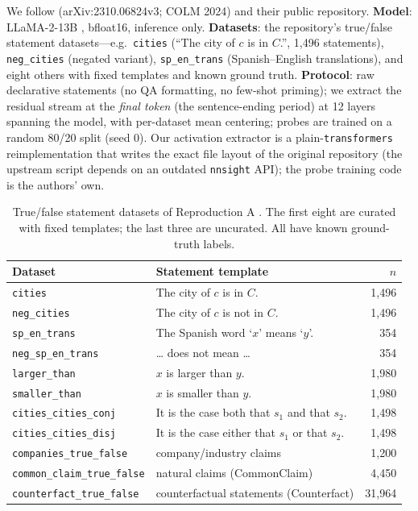\documentclass{article}
\begin{document}
We follow \citet{marks2024geometry} (arXiv:2310.06824v3; COLM 2024) and their
public repository. \textbf{Model}: LLaMA-2-13B \citep{touvron2023llama},
bfloat16, inference only. \textbf{Datasets}: the repository's true/false
statement datasets---e.g.\ \texttt{cities} (``The city of $c$ is in $C$.'',
1{,}496 statements), \texttt{neg\_cities} (negated variant),
\texttt{sp\_en\_trans} (Spanish--English translations), and eight others with
fixed templates and known ground truth. \textbf{Protocol}: raw declarative
statements (no QA formatting, no few-shot priming); we extract the residual
stream at the \emph{final token} (the sentence-ending period) at 12 layers
spanning the model, with per-dataset mean centering; probes are trained on a
random 80/20 split (seed 0). Our activation extractor is a
plain-\texttt{transformers} reimplementation that writes the exact file layout
of the original repository (the upstream script depends on an outdated
\texttt{nnsight} API); the probe training code is the authors' own.

\begin{table}[t]
  \caption{True/false statement datasets of Reproduction A
  \citep{marks2024geometry}. The first eight are curated with fixed templates;
  the last three are uncurated. All have known ground-truth labels.}
  \label{tab:datasets}
  \centering
  \small
  \begin{tabular}{llr}
    \toprule
    Dataset & Statement template & $n$ \\
    \midrule
    \texttt{cities} & The city of $c$ is in $C$. & 1{,}496 \\
    \texttt{neg\_cities} & The city of $c$ is not in $C$. & 1{,}496 \\
    \texttt{sp\_en\_trans} & The Spanish word `$x$' means `$y$'. & 354 \\
    \texttt{neg\_sp\_en\_trans} & \dots{} does not mean \dots & 354 \\
    \texttt{larger\_than} & $x$ is larger than $y$. & 1{,}980 \\
    \texttt{smaller\_than} & $x$ is smaller than $y$. & 1{,}980 \\
    \texttt{cities\_cities\_conj} & It is the case both that $s_1$ and that $s_2$. & 1{,}498 \\
    \texttt{cities\_cities\_disj} & It is the case either that $s_1$ or that $s_2$. & 1{,}498 \\
    \texttt{companies\_true\_false} & company/industry claims \citep{azaria2023internal} & 1{,}200 \\
    \texttt{common\_claim\_true\_false} & natural claims (CommonClaim) & 4{,}450 \\
    \texttt{counterfact\_true\_false} & counterfactual statements (Counterfact) & 31{,}964 \\
    \bottomrule
  \end{tabular}
\end{table}
\end{document}
